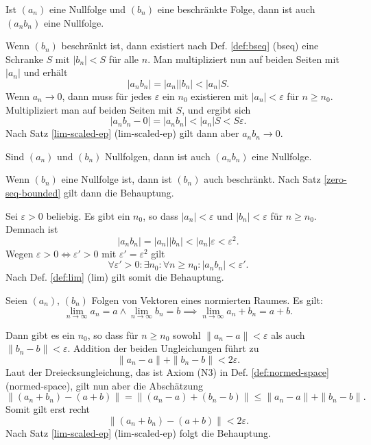 \begin{Satz}\label{zero-seq-bounded}
Ist $(a_n)$ eine Nullfolge und $(b_n)$ eine beschränkte Folge,
dann ist auch $(a_n b_n)$ eine Nullfolge.
\end{Satz}

\begin{Beweis}
Wenn $(b_n)$ beschränkt ist, dann existiert nach
Def. \ref{def:bseq} (bseq) eine Schranke $S$ mit
$|b_n|<S$ für alle $n$. Man multipliziert nun auf beiden Seiten
mit $|a_n|$ und erhält
\[|a_n b_n| = |a_n| |b_n| < |a_n| S.\]
Wenn $a_n\to 0$, dann muss für jedes $\varepsilon$
ein $n_0$ existieren mit $|a_n|<\varepsilon$ für $n\ge n_0$.
Multipliziert man auf beiden Seiten mit $S$, und ergibt sich
\[|a_n b_n-0| = |a_n b_n| < |a_n| S < S\varepsilon.\]
Nach Satz \ref{lim-scaled-ep} (lim-scaled-ep) gilt dann
aber $a_n b_n\to 0$.\,\qedsymbol
\end{Beweis}

\begin{Satz}
Sind $(a_n)$ und $(b_n)$ Nullfolgen,
dann ist auch $(a_n b_n)$ eine Nullfolge.
\end{Satz}

\begin{Beweis}[Beweis 1]
Wenn $(b_n)$ eine Nullfolge ist, dann ist $(b_n)$ auch beschränkt.
Nach Satz \ref{zero-seq-bounded} gilt dann die Behauptung.
\end{Beweis}

\begin{Beweis}[Beweis 2]
Sei $\varepsilon>0$ beliebig.
Es gibt ein $n_0$, so dass
$|a_n|<\varepsilon$ und $|b_n|<\varepsilon$ für $n\ge n_0$.
Demnach ist
\[|a_n b_n| = |a_n| |b_n|< |a_n|\varepsilon <\varepsilon^2.\]
Wegen $\varepsilon>0\iff\varepsilon'>0$ mit
$\varepsilon'=\varepsilon^2$ gilt
\[\forall\varepsilon'{>}0\colon\exists n_0\colon\forall n{\ge}n_0\colon
|a_n b_n|<\varepsilon'.\]
Nach Def. \ref{def:lim} (lim) gilt somit die Behauptung.\,\qedsymbol
\end{Beweis}

\newpage
\begin{Satz}%
\label{lim-add}
Seien $(a_n)$, $(b_n)$ Folgen von Vektoren eines normierten Raumes.
Es gilt:
\[\lim_{n\to\infty} a_n = a\land \lim_{n\to\infty} b_n
= b \implies \lim_{n\to\infty} a_n+b_n = a+b.\]
\end{Satz}

\begin{Beweis}
Dann gibt es ein $n_0$, so dass für $n\ge n_0$ sowohl
$\|a_n-a\|<\varepsilon$ als auch $\|b_n-b\|<\varepsilon$.
Addition der beiden Ungleichungen führt zu
\[\|a_n-a\| + \|b_n-b\| < 2\varepsilon.\]
Laut der Dreiecksungleichung, das ist Axiom (N3) in Def.
\ref{def:normed-space} (normed-space), gilt nun aber die Abschätzung
\[\|(a_n+b_n)-(a+b)\| = \|(a_n-a)+(b_n-b)\| \le \|a_n-a\|+\|b_n-b\|.\]
Somit gilt erst recht
\[\|(a_n+b_n)-(a+b)\| < 2\varepsilon.\]
Nach Satz \ref{lim-scaled-ep} (lim-scaled-ep)
folgt die Behauptung.\,\qedsymbol
\end{Beweis}

